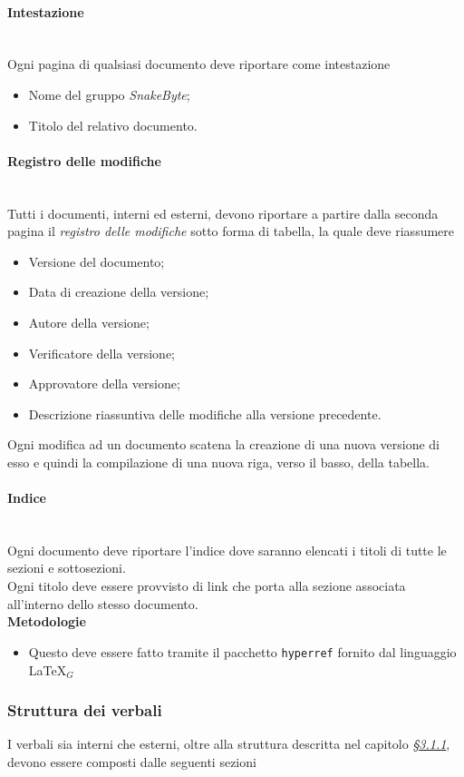 \documentclass[10pt, letterpaper]{article}
\newcommand{\trisubsection}[1]{\paragraph{#1}\mbox{}\\}
\begin{document}
\trisubsection{Intestazione}
Ogni pagina di qualsiasi documento deve riportare come intestazione
\begin{itemize}
    \item Nome del gruppo \textit{SnakeByte};
    \item Titolo del relativo documento.
\end{itemize}

\trisubsection{Registro delle modifiche}
Tutti i documenti, interni ed esterni, devono riportare a partire dalla seconda pagina il \textit{registro delle modifiche} sotto forma di tabella, la quale deve riassumere

\begin{itemize}
    \item Versione del documento;
    \item Data di creazione della versione;
    \item Autore della versione;
    \item Verificatore della versione;
    \item Approvatore della versione;
    \item Descrizione riassuntiva delle modifiche alla versione precedente.
\end{itemize}

\noindent
Ogni modifica ad un documento scatena la creazione di una nuova versione di esso e quindi la compilazione di una nuova riga, verso il basso, della tabella.

\trisubsection{Indice}
Ogni documento deve riportare l'indice dove saranno elencati i titoli di tutte le sezioni e sottosezioni. \\
Ogni titolo deve essere provvisto di link che porta alla sezione associata all'interno dello stesso documento.\\

\textbf{Metodologie}
\begin{itemize}
    \item Questo deve essere fatto tramite il pacchetto \texttt{hyperref} fornito dal linguaggio \LaTeX$_{G}$
\end{itemize}

\subsubsection{Struttura dei verbali}
I verbali sia interni che esterni, oltre alla struttura descritta nel capitolo \hyperref[sec:Struttura]{\textit{§3.1.1}}, devono essere composti dalle seguenti sezioni
\end{document}
